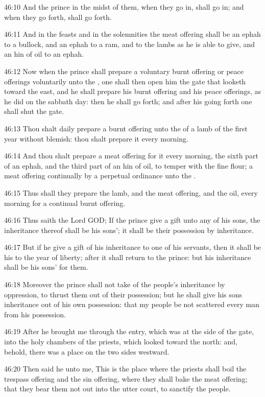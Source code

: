 46:10 And the prince in the midst of them, when they go in, shall go in; and when they go forth, shall go forth.

46:11 And in the feasts and in the solemnities the meat offering shall be an ephah to a bullock, and an ephah to a ram, and to the lambs as he is able to give, and an hin of oil to an ephah.

46:12 Now when the prince shall prepare a voluntary burnt offering or peace offerings voluntarily unto the \LORD, one shall then open him the gate that looketh toward the east, and he shall prepare his burnt offering and his peace offerings, as he did on the sabbath day: then he shall go forth; and after his going forth one shall shut the gate.

46:13 Thou shalt daily prepare a burnt offering unto the \LORD of a lamb of the first year without blemish: thou shalt prepare it every morning.

46:14 And thou shalt prepare a meat offering for it every morning, the sixth part of an ephah, and the third part of an hin of oil, to temper with the fine flour; a meat offering continually by a perpetual ordinance unto the \LORD.

46:15 Thus shall they prepare the lamb, and the meat offering, and the oil, every morning for a continual burnt offering.

46:16 Thus saith the Lord GOD; If the prince give a gift unto any of his sons, the inheritance thereof shall be his sons'; it shall be their possession by inheritance.

46:17 But if he give a gift of his inheritance to one of his servants, then it shall be his to the year of liberty; after it shall return to the prince: but his inheritance shall be his sons' for them.

46:18 Moreover the prince shall not take of the people's inheritance by oppression, to thrust them out of their possession; but he shall give his sons inheritance out of his own possession: that my people be not scattered every man from his possession.

46:19 After he brought me through the entry, which was at the side of the gate, into the holy chambers of the priests, which looked toward the north: and, behold, there was a place on the two sides westward.

46:20 Then said he unto me, This is the place where the priests shall boil the trespass offering and the sin offering, where they shall bake the meat offering; that they bear them not out into the utter court, to sanctify the people.


